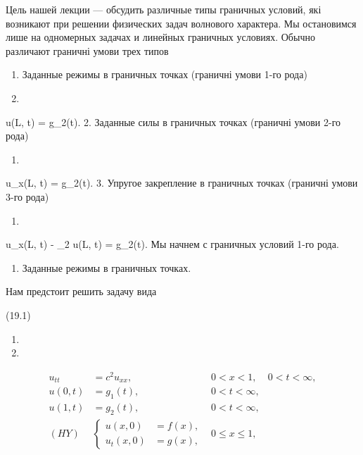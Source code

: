 \documentclass[
  ukrainian,
]{article}
\providecommand{\tightlist}{%
  \setlength{\itemsep}{0pt}\setlength{\parskip}{0pt}}
\begin{document}
Цель нашей лекции --- обсудить различные типы граничных условий, які
возникают при решении физических задач волнового характера. Мы
остановимся лише на одномерных задачах и линейных граничных условиях.
Обычно различают граничні умови трех типов

\begin{enumerate}
\def\labelenumi{\arabic{enumi}.}
\item
  Заданные режимы в граничных точках (граничні умови 1-го рода)
\item
\end{enumerate}

u(L, t) = g\_2(t). 2. Заданные силы в граничных точках (граничні умови
2-го рода)

\begin{enumerate}
\def\labelenumi{\arabic{enumi}.}
\setcounter{enumi}{15}
\tightlist
\item
\end{enumerate}

u\_x(L, t) = g\_2(t). 3. Упругое закрепление в граничных точках
(граничні умови 3-го рода)

\begin{enumerate}
\def\labelenumi{\arabic{enumi}.}
\setcounter{enumi}{16}
\tightlist
\item
\end{enumerate}

u\_x(L, t) - \gamma\_2 u(L, t) = g\_2(t). Мы начнем с граничных условий
1-го рода.

\begin{enumerate}
\def\labelenumi{\arabic{enumi}.}
\tightlist
\item
  Заданные режимы в граничных точках.
\end{enumerate}

Нам предстоит решить задачу вида

(19.1)

\begin{enumerate}
\def\labelenumi{\arabic{enumi}.}
\setcounter{enumi}{17}
\tightlist
\item
\item
\end{enumerate}

\[
\begin{aligned} u_{tt} &= c^2 u_{xx}, & 0 < x < 1, & 0 < t < \infty, \\ u(0, t) &= g_1(t), & 0 < t < \infty, \\ u(1, t) &= g_2(t), & 0 < t < \infty, \\ (HY) &\begin{cases} u(x, 0) &= f(x), \\ u_t(x, 0) &= g(x), \end{cases} & 0 \leqslant x \leqslant 1, \end{aligned}
\]
\end{document}
